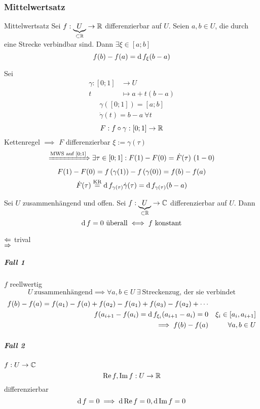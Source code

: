 \subsubsection{Mittelwertsatz}
\begin{Sat}{Mittelwertsatz}
  Sei $f:\underbrace{U}_{\subset\mathbb{R}}\to \mathbb{R}$ differenzierbar auf $U$. Seien $a,b\in U$, die durch eine Strecke verbindbar sind. Dann $\exists \xi\in [a;b]$
  \[f(b)-f(a)=\operatorname{d} f_\xi(b-a)\]
\end{Sat}
\begin{Bew}
  Sei
  \begin{align*}
    \gamma:[0;1]&\to U\\
    t&\mapsto a+t(b-a)
  \end{align*}
  \begin{gather*}
    \gamma\left( [0;1] \right)=[a;b]\\
    \dot\gamma(t)=b-a\ \forall t
  \end{gather*}
  \[F:f\circ \gamma:[0;1]\to\mathbb{R}\]
  Kettenregel $\implies$ $F$ differenzierbar $\xi:=\gamma(\tau)$
  \begin{gather*}
  \xRightarrow{\text{MWS auf } [0;1]}\exists \tau\in[0;1]:F(1)-F(0)=\dot F(\tau)\ (1-0)\\
  F(1)-F(0)=f\left( \gamma(1) \right)-f\left( \gamma(0) \right)=f(b)-f(a)\\
  \dot F(\tau) \stackrel{\text{KR}}{=} \operatorname{d} f_{\gamma(\tau)} \dot\gamma (\tau)=\operatorname{d} f_{\gamma(\tau) } (b-a)
  \end{gather*}
\end{Bew}
\begin{Kor}
  Sei $U$ zusammenhängend und offen. Sei $f:\underbrace{U}_{\subset\mathbb{R}}\to \mathbb{C}$ differenzierbar auf $U$. Dann
  \[\md f=0\ \text{überall}\iff f\ \text{konstant}\]
\end{Kor}
\begin{Bew}
  $\Leftarrow$ trival\\
  $\Rightarrow$
  \subparagraph{Fall 1} $f$ reellwertig
  \[U\ \text{zusammenhängend}\implies \forall a,b\in U\ \exists\ \text{Streckenzug, der sie verbindet}\]
  \begin{align*}
    f(b)-f(a)=f(a_1)-f(a)+f(a_2)-f(a_1)+f(a_3)-f(a_2)+\cdots\\
    f(a_{i+1}-f(a_i)=\operatorname{d} f_{\xi_i}(a_{i+1}-a_i)=0 && \xi_i\in[a_i,a_{i+1}]\\
    \implies f(b)-f(a) &&\forall a,b\in U
  \end{align*}
  \subparagraph{Fall 2} $f:U\to \mathbb{C}$
  \[\operatorname{Re} f, \operatorname{Im} f:U\to\mathbb{R}\]
  differenzierbar
  \[\operatorname{d} f=0\implies \operatorname{d} \operatorname{Re} f=0,\operatorname{d} \operatorname{Im} f=0\]
\end{Bew}
